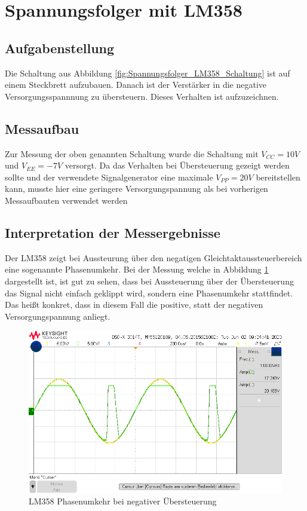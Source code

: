 \section{Spannungsfolger mit LM358}
\subsection{Aufgabenstellung}
Die Schaltung aus Abbildung \ref{fig:Spannungsfolger_LM358_Schaltung} ist auf einem Steckbrett aufzubauen. Danach ist der Verstärker in die negative Versorgungsspannnung zu übersteuern. Dieses Verhalten ist aufzuzeichnen. 

\subsection{Messaufbau}
Zur Messung der oben genannten Schaltung wurde die Schaltung mit $V_{CC} = 10V$ und $V_{EE} = -7V$ versorgt. Da das Verhalten bei Übersteuerung gezeigt werden sollte und der verwendete Signalgenerator eine maximale $V_{PP} = 20V$ bereitstellen kann, musste hier eine geringere Versorgungspannung als bei vorherigen Messaufbauten verwendet werden

\subsection{Interpretation der Messergebnisse}
Der LM358 zeigt bei Aussteurung über den negatigen Gleichtaktaussteuerbereich eine sogenannte Phasenumkehr. Bei der Messung welche in Abbildung \ref{fig:LM358_Phasenumkehr} dargestellt ist, ist gut zu sehen, dass bei Aussteuerung über der Übersteuerung das Signal nicht einfach geklippt wird, sondern eine Phasenumkehr stattfindet. Das heißt konkret, dass in diesem Fall die positive, statt der negativen Versorgungspannung anliegt. 
\begin{figure}[H]
    \centering
    \includegraphics[width=\textwidth]{Lab_2/Messungen/Follower/scope_35.png}
    \caption{LM358 Phasenumkehr bei negativer Übersteuerung}
    \label{fig:LM358_Phasenumkehr}
\end{figure}

